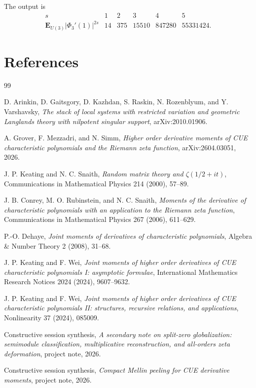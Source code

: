 \documentclass[11pt]{article}
\theoremstyle{plain}
\theoremstyle{definition}
\begin{document}
The output is
\[
\begin{array}{c|ccccc}
 s&1&2&3&4&5\\ \hline
 \mathbf E_{U(3)}|\Phi_3'(1)|^{2s}&14&375&15510&847280&55331424.
\end{array}
\]

\section*{References}
\begin{thebibliography}{99}

D. Arinkin, D. Gaitsgory, D. Kazhdan, S. Raskin, N. Rozenblyum, and Y. Varshavsky,
\emph{The stack of local systems with restricted variation and geometric Langlands theory with nilpotent singular support}, arXiv:2010.01906.

A. Grover, F. Mezzadri, and N. Simm,
\emph{Higher order derivative moments of CUE characteristic polynomials and the Riemann zeta function}, arXiv:2604.03051, 2026.

J. P. Keating and N. C. Snaith,
\emph{Random matrix theory and \(\zeta(1/2+it)\)}, Communications in Mathematical Physics 214 (2000), 57--89.

J. B. Conrey, M. O. Rubinstein, and N. C. Snaith,
\emph{Moments of the derivative of characteristic polynomials with an application to the Riemann zeta function}, Communications in Mathematical Physics 267 (2006), 611--629.

P.-O. Dehaye,
\emph{Joint moments of derivatives of characteristic polynomials}, Algebra \& Number Theory 2 (2008), 31--68.

J. P. Keating and F. Wei,
\emph{Joint moments of higher order derivatives of CUE characteristic polynomials I: asymptotic formulae}, International Mathematics Research Notices 2024 (2024), 9607--9632.

J. P. Keating and F. Wei,
\emph{Joint moments of higher order derivatives of CUE characteristic polynomials II: structures, recursive relations, and applications}, Nonlinearity 37 (2024), 085009.

Constructive session synthesis,
\emph{A secondary note on split-zero globalization: semimodule classification, multiplicative reconstruction, and all-orders zeta deformation}, project note, 2026.

Constructive session synthesis,
\emph{Compact Mellin peeling for CUE derivative moments}, project note, 2026.


\end{thebibliography}
\end{document}
